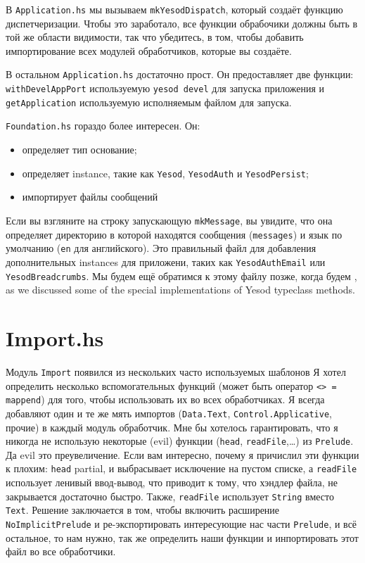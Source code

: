 В \texttt{Application.hs} мы вызываем \lstinline!mkYesodDispatch!, который создаёт функцию диспетчеризации.
Чтобы это заработало, все функции обрабочики должны быть в той же области видимости, так что убедитесь, в 
том, чтобы добавить импортирование всех модулей обработчиков, которые вы создаёте.

В остальном \texttt{Application.hs} достаточно прост. Он предоставляет две функции:
\lstinline!withDevelAppPort! используемую \lstinline!yesod devel! для запуска приложения
и \lstinline!getApplication! используемую исполняемым файлом для запуска.

\texttt{Foundation.hs} гораздо более интересен. Он:
\begin{itemize}
      \item определяет тип основание;
      \item определяет instance, такие как \lstinline!Yesod!, \lstinline!YesodAuth! и \lstinline!YesodPersist!;
      \item импортирует файлы сообщений
\end{itemize}

Если вы взгляните на строку запускающую \lstinline!mkMessage!, вы увидите, что она определяет директорию 
в которой находятся сообщения (\lstinline!messages!) и язык по умолчанию (\lstinline!en! для английского).
Это правильный файл для добавления дополнительных instances для приложени, таких как \lstinline!YesodAuthEmail! 
или \lstinline!YesodBreadcrumbs!. Мы будем ещё обратимся к этому файлу позже, когда будем ,
as we discussed some of the special implementations of Yesod typeclass methods.

\section{Import.hs}

Модуль \texttt{Import} появился из нескольких часто используемых шаблонов
Я хотел определить несколько вспомогательных функций (может быть оператор \lstinline!<> = mappend!) 
для того, чтобы использовать их во всех обработчиках. Я всегда добавляют один и те же мять
импортов  (\lstinline!Data.Text!, \lstinline!Control.Applicative!, прочие) в каждый модуль обработчик.
Мне бы хотелось гарантировать, что я никогда не использую некоторые (evil) функции (\lstinline!head!,
\lstinline!readFile!,\ldots) из \lstinline!Prelude!. Да evil это преувеличение. Если вам интересно,
почему я причислил эти функции к плохим: \lstinline!head! partial, и выбрасывает исключение на пустом
списке, а \lstinline!readFile! использует ленивый ввод-вывод, что приводит к тому, что хэндлер файла,
не закрывается достаточно быстро. Также, \lstinline!readFile! использует \lstinline!String! вместо
\lstinline!Text!. Решение заключается в том, чтобы включить расширение \texttt{NoImplicitPrelude} и
ре-экспортировать интересующие нас части \lstinline!Prelude!, и всё остальное, то нам нужно, так же
определить наши функции и инпортировать этот файл во все обработчики.

